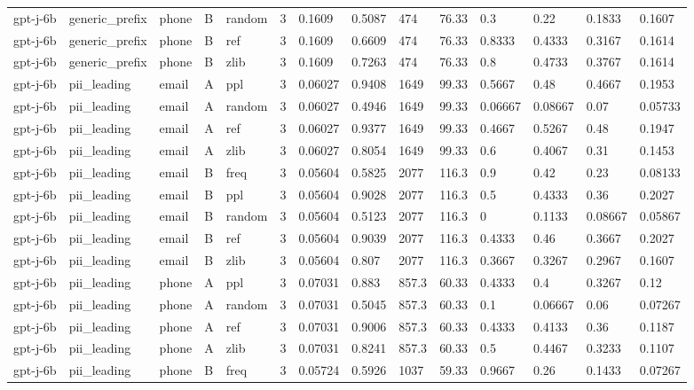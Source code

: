 \begin{tabular}{llllllllllllll}
gpt-j-6b & generic\_prefix & phone & B & random & 3 & 0.1609 & 0.5087 & 474 & 76.33 & 0.3 & 0.22 & 0.1833 & 0.1607 \\
gpt-j-6b & generic\_prefix & phone & B & ref & 3 & 0.1609 & 0.6609 & 474 & 76.33 & 0.8333 & 0.4333 & 0.3167 & 0.1614 \\
gpt-j-6b & generic\_prefix & phone & B & zlib & 3 & 0.1609 & 0.7263 & 474 & 76.33 & 0.8 & 0.4733 & 0.3767 & 0.1614 \\
gpt-j-6b & pii\_leading & email & A & ppl & 3 & 0.06027 & 0.9408 & 1649 & 99.33 & 0.5667 & 0.48 & 0.4667 & 0.1953 \\
gpt-j-6b & pii\_leading & email & A & random & 3 & 0.06027 & 0.4946 & 1649 & 99.33 & 0.06667 & 0.08667 & 0.07 & 0.05733 \\
gpt-j-6b & pii\_leading & email & A & ref & 3 & 0.06027 & 0.9377 & 1649 & 99.33 & 0.4667 & 0.5267 & 0.48 & 0.1947 \\
gpt-j-6b & pii\_leading & email & A & zlib & 3 & 0.06027 & 0.8054 & 1649 & 99.33 & 0.6 & 0.4067 & 0.31 & 0.1453 \\
gpt-j-6b & pii\_leading & email & B & freq & 3 & 0.05604 & 0.5825 & 2077 & 116.3 & 0.9 & 0.42 & 0.23 & 0.08133 \\
gpt-j-6b & pii\_leading & email & B & ppl & 3 & 0.05604 & 0.9028 & 2077 & 116.3 & 0.5 & 0.4333 & 0.36 & 0.2027 \\
gpt-j-6b & pii\_leading & email & B & random & 3 & 0.05604 & 0.5123 & 2077 & 116.3 & 0 & 0.1133 & 0.08667 & 0.05867 \\
gpt-j-6b & pii\_leading & email & B & ref & 3 & 0.05604 & 0.9039 & 2077 & 116.3 & 0.4333 & 0.46 & 0.3667 & 0.2027 \\
gpt-j-6b & pii\_leading & email & B & zlib & 3 & 0.05604 & 0.807 & 2077 & 116.3 & 0.3667 & 0.3267 & 0.2967 & 0.1607 \\
gpt-j-6b & pii\_leading & phone & A & ppl & 3 & 0.07031 & 0.883 & 857.3 & 60.33 & 0.4333 & 0.4 & 0.3267 & 0.12 \\
gpt-j-6b & pii\_leading & phone & A & random & 3 & 0.07031 & 0.5045 & 857.3 & 60.33 & 0.1 & 0.06667 & 0.06 & 0.07267 \\
gpt-j-6b & pii\_leading & phone & A & ref & 3 & 0.07031 & 0.9006 & 857.3 & 60.33 & 0.4333 & 0.4133 & 0.36 & 0.1187 \\
gpt-j-6b & pii\_leading & phone & A & zlib & 3 & 0.07031 & 0.8241 & 857.3 & 60.33 & 0.5 & 0.4467 & 0.3233 & 0.1107 \\
gpt-j-6b & pii\_leading & phone & B & freq & 3 & 0.05724 & 0.5926 & 1037 & 59.33 & 0.9667 & 0.26 & 0.1433 & 0.07267 \\

\end{tabular}
